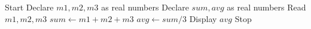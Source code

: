 \begin{algorithm}
\caption{Average Calculation Program}
\begin{algorithmic}[1]

\STATE Start
\STATE Declare $m1, m2, m3$ as real numbers
\STATE Declare $sum, avg$ as real numbers
\STATE Read $m1, m2, m3$
\STATE $sum \leftarrow m1 + m2 + m3$
\STATE $avg \leftarrow sum / 3$
\STATE Display $avg$
\STATE Stop

\end{algorithmic}
\end{algorithm}